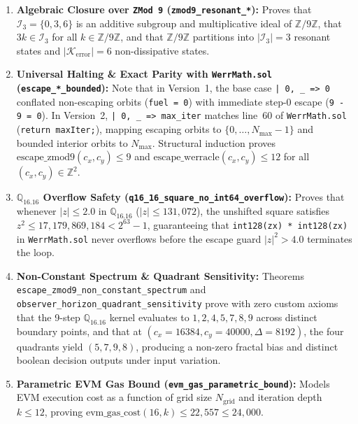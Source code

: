 \documentclass[10pt,a4paper]{article}
\begin{document}
\begin{enumerate}[leftmargin=1.6em,itemsep=2pt,topsep=2pt]
    \item \textbf{Algebraic Closure over \texttt{ZMod 9} (\texttt{zmod9\_resonant\_*}):} Proves that $\mathcal{I}_3 = \{0,3,6\}$ is an additive subgroup and multiplicative ideal of $\mathbb{Z}/9\mathbb{Z}$, that $3k \in \mathcal{I}_3$ for all $k \in \mathbb{Z}/9\mathbb{Z}$, and that $\mathbb{Z}/9\mathbb{Z}$ partitions into $|\mathcal{I}_3|=3$ resonant states and $|\mathcal{K}_{\text{error}}|=6$ non-dissipative states.
    \item \textbf{Universal Halting \& Exact Parity with \texttt{WerrMath.sol} (\texttt{escape\_*\_bounded}):} Note that in Version~1, the base case \texttt{| 0, \_ => 0} conflated non-escaping orbits (\texttt{fuel = 0}) with immediate step-0 escape (\texttt{9 - 9 = 0}). In Version~2, \texttt{| 0, \_ => max\_iter} matches line~60 of \texttt{WerrMath.sol} (\texttt{return maxIter;}), mapping escaping orbits to $\{0, \dots, N_{\max}-1\}$ and bounded interior orbits to $N_{\max}$. Structural induction proves $\text{escape\_zmod9}(c_x, c_y) \le 9$ and $\text{escape\_werracle}(c_x, c_y) \le 12$ for all $(c_x, c_y) \in \mathbb{Z}^2$.
    \item \textbf{$\mathbb{Q}_{16.16}$ Overflow Safety (\texttt{q16\_16\_square\_no\_int64\_overflow}):} Proves that whenever $|z| \le 2.0$ in $\mathbb{Q}_{16.16}$ ($|z| \le 131,072$), the unshifted square satisfies $z^2 \le 17,179,869,184 < 2^{63}-1$, guaranteeing that \texttt{int128(zx) * int128(zx)} in \texttt{WerrMath.sol} never overflows before the escape guard $|z|^2 > 4.0$ terminates the loop.
    \item \textbf{Non-Constant Spectrum \& Quadrant Sensitivity:} Theorems \texttt{escape\_zmod9\_non\_constant\_spectrum} and \texttt{observer\_horizon\_quadrant\_sensitivity} prove with zero custom axioms that the 9-step $\mathbb{Q}_{16.16}$ kernel evaluates to $1, 2, 4, 5, 7, 8, 9$ across distinct boundary points, and that at $(c_x = 16384, c_y = 40000, \Delta = 8192)$, the four quadrants yield $(5, 7, 9, 8)$, producing a non-zero fractal bias and distinct boolean decision outputs under input variation.
    \item \textbf{Parametric EVM Gas Bound (\texttt{evm\_gas\_parametric\_bound}):} Models EVM execution cost as a function of grid size $N_{\text{grid}}$ and iteration depth $k \le 12$, proving $\text{evm\_gas\_cost}(16, k) \le 22,557 \le 24,000$.
\end{enumerate}
\end{document}
